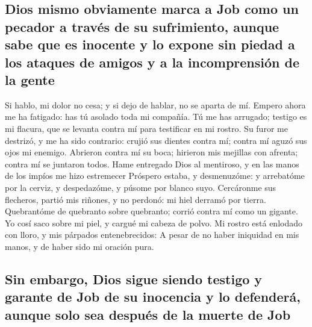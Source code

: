 \hypertarget{dios-mismo-obviamente-marca-a-job-como-un-pecador-a-travuxe9s-de-su-sufrimiento-aunque-sabe-que-es-inocente-y-lo-expone-sin-piedad-a-los-ataques-de-amigos-y-a-la-incomprensiuxf3n-de-la-gente}{%
\subsection{Dios mismo obviamente marca a Job como un pecador a través
de su sufrimiento, aunque sabe que es inocente y lo expone sin piedad a
los ataques de amigos y a la incomprensión de la
gente}\label{dios-mismo-obviamente-marca-a-job-como-un-pecador-a-travuxe9s-de-su-sufrimiento-aunque-sabe-que-es-inocente-y-lo-expone-sin-piedad-a-los-ataques-de-amigos-y-a-la-incomprensiuxf3n-de-la-gente}}

 Si hablo, mi dolor no cesa; y si dejo de hablar, no se
aparta de mí.  Empero ahora me ha fatigado: has tú asolado
toda mi compañía.  Tú me has arrugado; testigo es mi
flacura, que se levanta contra mí para testificar en mi rostro.
 Su furor me destrizó, y me ha sido contrario: crujió sus
dientes contra mí; contra mí aguzó sus ojos mi enemigo. 
Abrieron contra mí su boca; hirieron mis mejillas con afrenta; contra mí
se juntaron todos.  Hame entregado Dios al mentiroso, y en
las manos de los impíos me hizo estremecer  Próspero
estaba, y desmenuzóme: y arrebatóme por la cerviz, y despedazóme, y
púsome por blanco suyo.  Cercáronme sus flecheros, partió
mis riñones, y no perdonó: mi hiel derramó por tierra. 
Quebrantóme de quebranto sobre quebranto; corrió contra mí como un
gigante.  Yo cosí saco sobre mi piel, y cargué mi cabeza de
polvo.  Mi rostro está enlodado con lloro, y mis párpados
entenebrecidos:  A pesar de no haber iniquidad en mis
manos, y de haber sido mi oración pura.

\hypertarget{sin-embargo-dios-sigue-siendo-testigo-y-garante-de-job-de-su-inocencia-y-lo-defenderuxe1-aunque-solo-sea-despuuxe9s-de-la-muerte-de-job}{%
\subsection{Sin embargo, Dios sigue siendo testigo y garante de Job de
su inocencia y lo defenderá, aunque solo sea después de la muerte de
Job}\label{sin-embargo-dios-sigue-siendo-testigo-y-garante-de-job-de-su-inocencia-y-lo-defenderuxe1-aunque-solo-sea-despuuxe9s-de-la-muerte-de-job}}

